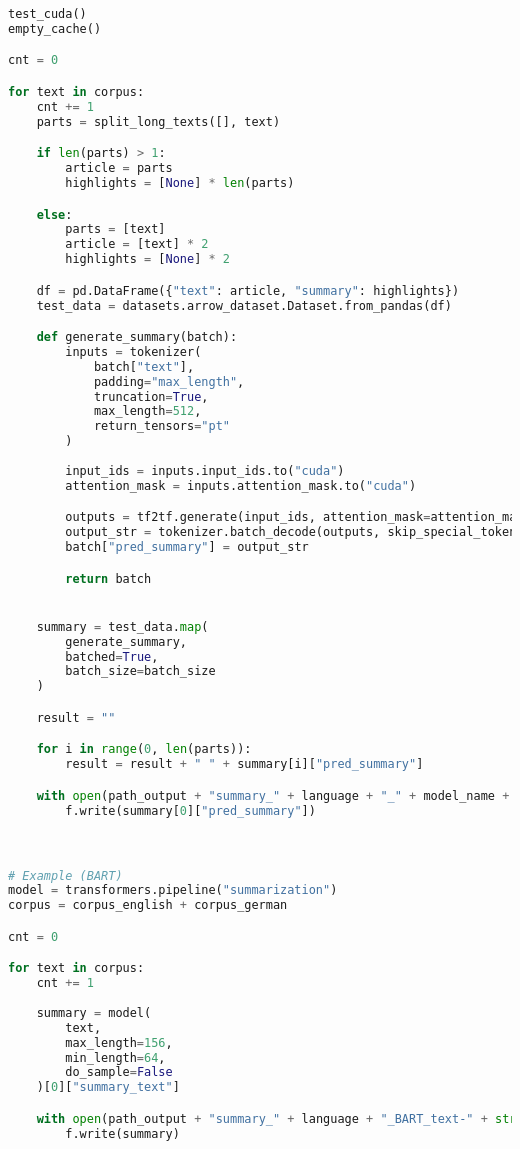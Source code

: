 \begin{lstlisting}[language=Python, caption=Beispielcode]
test_cuda()
empty_cache()

cnt = 0

for text in corpus:
    cnt += 1
    parts = split_long_texts([], text)

    if len(parts) > 1:
        article = parts
        highlights = [None] * len(parts)

    else:
        parts = [text]
        article = [text] * 2
        highlights = [None] * 2

    df = pd.DataFrame({"text": article, "summary": highlights})
    test_data = datasets.arrow_dataset.Dataset.from_pandas(df)

    def generate_summary(batch):
        inputs = tokenizer(
            batch["text"],
            padding="max_length",
            truncation=True,
            max_length=512,
            return_tensors="pt"
        )
        
        input_ids = inputs.input_ids.to("cuda")
        attention_mask = inputs.attention_mask.to("cuda")

        outputs = tf2tf.generate(input_ids, attention_mask=attention_mask)
        output_str = tokenizer.batch_decode(outputs, skip_special_tokens=True)
        batch["pred_summary"] = output_str

        return batch


    summary = test_data.map(
        generate_summary,
        batched=True,
        batch_size=batch_size
    )

    result = ""

    for i in range(0, len(parts)):
        result = result + " " + summary[i]["pred_summary"]

    with open(path_output + "summary_" + language + "_" + model_name + "_text-" + str(cnt) + ".txt", "w", encoding="utf-8") as f:
        f.write(summary[0]["pred_summary"])



# Example (BART)
model = transformers.pipeline("summarization")
corpus = corpus_english + corpus_german

cnt = 0

for text in corpus:
    cnt += 1
    
    summary = model(
        text,
        max_length=156,
        min_length=64,
        do_sample=False
    )[0]["summary_text"]

    with open(path_output + "summary_" + language + "_BART_text-" + str(cnt) + ".txt", "w", encoding="utf-8") as f:
        f.write(summary)
\end{lstlisting}
\newpage

